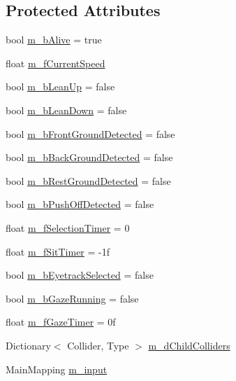 \subsection*{Protected Attributes}
\begin{DoxyCompactItemize}
\item 
bool \mbox{\hyperlink{class_animal_a13a58afa816beb7dad10681097a892e0}{m\+\_\+b\+Alive}} = true
\item 
float \mbox{\hyperlink{class_animal_a8524e219275547954f825c20f17bbfe0}{m\+\_\+f\+Current\+Speed}}
\item 
bool \mbox{\hyperlink{class_animal_a673ca86d1a63c980d0ccacdfeaa2de2e}{m\+\_\+b\+Lean\+Up}} = false
\item 
bool \mbox{\hyperlink{class_animal_aaacd73148a6d15b2b21092b20f5d768e}{m\+\_\+b\+Lean\+Down}} = false
\item 
bool \mbox{\hyperlink{class_animal_a55878750829ba48c39a10e5ee0c6b56c}{m\+\_\+b\+Front\+Ground\+Detected}} = false
\item 
bool \mbox{\hyperlink{class_animal_a935c18a78366e760feac53a0d286c13a}{m\+\_\+b\+Back\+Ground\+Detected}} = false
\item 
bool \mbox{\hyperlink{class_animal_a34c35ef0f61aefb64431cc04c82b5054}{m\+\_\+b\+Rest\+Ground\+Detected}} = false
\item 
bool \mbox{\hyperlink{class_animal_afb686c69d662317515547b34b8a69186}{m\+\_\+b\+Push\+Off\+Detected}} = false
\item 
float \mbox{\hyperlink{class_animal_a5689132f4b5d01cf746ddcdca9f1a9ef}{m\+\_\+f\+Selection\+Timer}} = 0
\item 
float \mbox{\hyperlink{class_animal_a1b9b1c77bf11c1b2ea6ad9db79951194}{m\+\_\+f\+Sit\+Timer}} = -\/1f
\item 
bool \mbox{\hyperlink{class_animal_a7ae58603453bea1c8a51feca5b36faf7}{m\+\_\+b\+Eyetrack\+Selected}} = false
\item 
bool \mbox{\hyperlink{class_animal_a00f65a0b9ad23dfd2e6c65262319548c}{m\+\_\+b\+Gaze\+Running}} = false
\item 
float \mbox{\hyperlink{class_animal_aec0a0921e0e2e4be62042fdfb2ab1a9b}{m\+\_\+f\+Gaze\+Timer}} = 0f
\item 
Dictionary$<$ Collider, Type $>$ \mbox{\hyperlink{class_animal_a7cc77366452cd8d15d5623dc2b368fee}{m\+\_\+d\+Child\+Colliders}}
\item 
Main\+Mapping \mbox{\hyperlink{class_animal_afe1492caf21bd4fc102c0336e9d0c52f}{m\+\_\+input}}
\end{DoxyCompactItemize}
